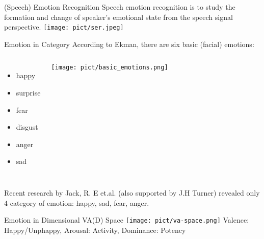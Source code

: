 \documentclass[aspectratio=169]{beamer}
\begin{document}
\begin{frame}[t, fragile]{(Speech) Emotion Recognition}
Speech emotion recognition is to study the formation and change of speaker’s emotional state from the speech signal perspective.
\texttt{[image: pict/ser.jpeg]}
\end{frame}

\begin{frame}[t, fragile]{Emotion in Category}
According to Ekman\footnotemark, there are six basic (facial) emotions:
\begin{columns}
\begin{itemize}
\item happy
\item surprise
\item fear
\item disgust
\item anger
\item sad
\end{itemize}
\texttt{[image: pict/basic\_emotions.png]}
\end{columns}
Recent research by Jack, R\footnotemark. E et.al. (also supported by J.H Turner) revealed 
only 4 category of emotion: happy, sad, fear, anger.
\end{frame}

\begin{frame}[t, fragile]{Emotion in Dimensional VA(D) Space}
\texttt{[image: pict/va-space.png]}
\newline
Valence: Happy/Unphappy, Arousal: Activity, Dominance: Potency
\end{frame}

\end{document}
